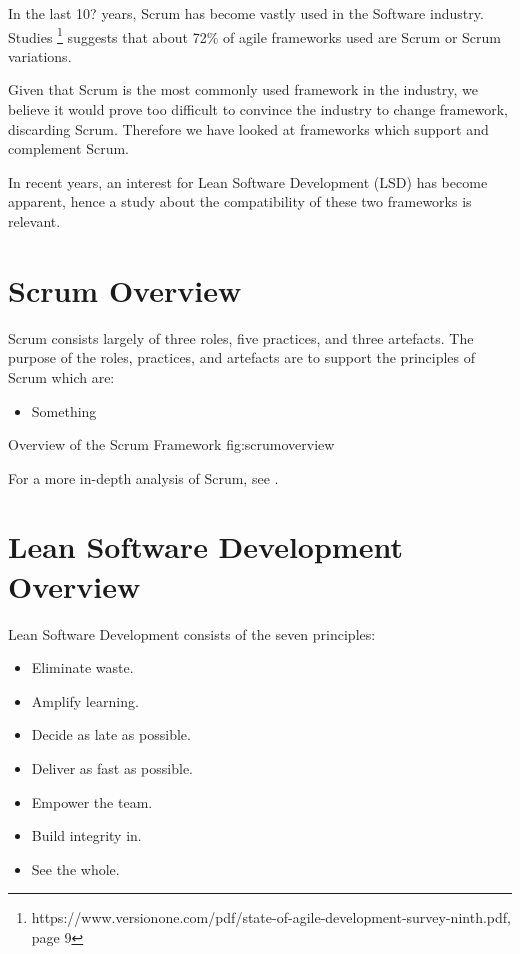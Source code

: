 In the last 10? years, Scrum has become vastly used in the Software industry. 
Studies \footnote{https://www.versionone.com/pdf/state-of-agile-development-survey-ninth.pdf, page 9}
 suggests that about 72\% of agile frameworks used are Scrum or Scrum variations.
 
Given that Scrum is the most commonly used framework in the industry, we believe it would prove too difficult to convince the industry to change framework, discarding Scrum.
Therefore we have looked at frameworks which support and complement Scrum.

In recent years, an interest for Lean Software Development (LSD) has become apparent, hence a study about the compatibility of these two frameworks is relevant. 


\section{Scrum Overview}
Scrum consists largely of three roles, %
five practices, %
and three artefacts. %
The purpose of the roles, practices, and artefacts are to support the principles of Scrum which are:
\begin{itemize}
	\item Something
\end{itemize}

{Overview of the Scrum Framework}
{fig:scrumoverview}

For a more in-depth analysis of Scrum, see .

\section{Lean Software Development Overview}
Lean Software Development consists of the seven principles:
\begin{itemize}
	\item Eliminate waste.
	\item Amplify learning.
	\item Decide as late as possible.
	\item Deliver as fast as possible.
	\item Empower the team.
	\item Build integrity in.
	\item See the whole.
\end{itemize}


